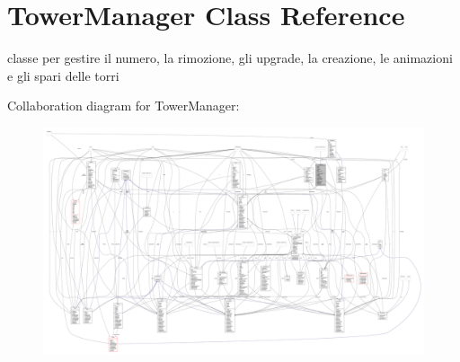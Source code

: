 \hypertarget{classmanagers_1_1_tower_manager}{}\section{Tower\+Manager Class Reference}
\label{classmanagers_1_1_tower_manager}


classe per gestire il numero, la rimozione, gli upgrade, la creazione, le animazioni e gli spari delle torri  




Collaboration diagram for Tower\+Manager\+:
\nopagebreak
\begin{figure}[H]
\begin{center}
\leavevmode
\includegraphics[width=350pt]{classmanagers_1_1_tower_manager__coll__graph}
\end{center}
\end{figure}
